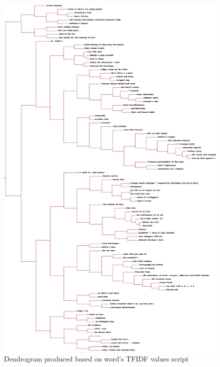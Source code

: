 \begin{figure}[h]
\centerline{\includegraphics[scale=0.36]{questions/q5/blogclust-q5.jpg}}
\caption{Dendrogram produced based on word's TFIDF values script}
\label{fig:q5dendrogram}
\end{figure}

\newpage





\newpage
